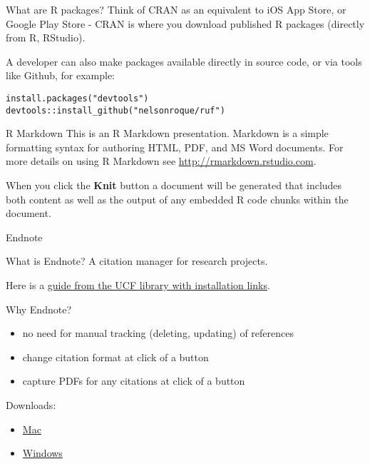\documentclass[
  ignorenonframetext,
]{beamer}
\providecommand{\tightlist}{%
  \setlength{\itemsep}{0pt}\setlength{\parskip}{0pt}}
\begin{document}
\begin{frame}[fragile]{What are R packages?}
\protect\hypertarget{what-are-r-packages}{}
Think of CRAN as an equivalent to iOS App Store, or Google Play Store -
CRAN is where you download published R packages (directly from R,
RStudio).

A developer can also make packages available directly in source code, or
via tools like Github, for example:

\begin{verbatim}
install.packages("devtools")
devtools::install_github("nelsonroque/ruf")
\end{verbatim}
\end{frame}

\begin{frame}{R Markdown}
\protect\hypertarget{r-markdown}{}
This is an R Markdown presentation. Markdown is a simple formatting
syntax for authoring HTML, PDF, and MS Word documents. For more details
on using R Markdown see \url{http://rmarkdown.rstudio.com}.

When you click the \textbf{Knit} button a document will be generated
that includes both content as well as the output of any embedded R code
chunks within the document.
\end{frame}

\begin{frame}{Endnote}
\protect\hypertarget{endnote}{}
\begin{block}{What is Endnote?}
\protect\hypertarget{what-is-endnote}{}
A citation manager for research projects.

Here is a \href{https://guides.ucf.edu/citations-endnote}{guide from the
UCF library with installation links}.
\end{block}

\begin{block}{Why Endnote?}
\protect\hypertarget{why-endnote}{}
\begin{itemize}
\tightlist
\item
  no need for manual tracking (deleting, updating) of references
\item
  change citation format at click of a button
\item
  capture PDFs for any citations at click of a button
\end{itemize}
\end{block}

\begin{block}{Downloads:}
\protect\hypertarget{downloads}{}
\begin{itemize}
\tightlist
\item
  \href{http://ezproxy.library.ucf.edu/loggedin/EndNote20SiteInstaller.zip}{Mac}
\item
  \href{http://ezproxy.library.ucf.edu/loggedin/EndNote20.zip}{Windows}
\end{itemize}
\end{block}
\end{frame}
\end{document}

